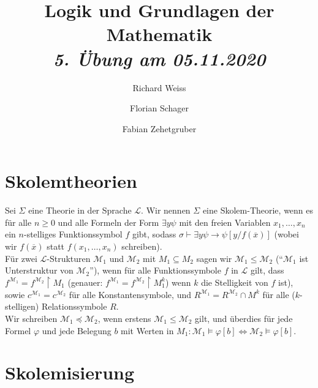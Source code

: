 \documentclass{article}
\title
{
  Logik und Grundlagen der Mathematik \\
  \vspace{4pt}
  \normalsize
  \textit{5. Übung am 05.11.2020}
}
\author
{
  Richard Weiss
  \and
  Florian Schager
  \and
  Fabian Zehetgruber
}
\date{}
\begin{document}
\maketitle
\section*{Skolemtheorien}
Sei $\Sigma$ eine Theorie in der Sprache $\mathscr{L}$. Wir nennen $\Sigma$ eine
Skolem-Theorie, wenn es für alle $n \geq 0$ und alle Formeln der Form $\exists y \psi$
mit den freien Variablen $x_1,\dots,x_n$ ein $n$-stelliges Funktionssymbol $f$ gibt,
sodass $\sigma \vdash \exists y \psi \rightarrow \psi[y/f(\overline{x})]$ (wobei wir
$f(\overline{x})$ statt $f(x_1,\dots,x_n)$ schreiben). \\
Für zwei $\mathscr{L}$-Strukturen $\mathscr{M}_1$ und $\mathscr{M}_2$ mit $M_1 \subseteq M_2$
sagen wir $\mathscr{M}_1 \leq \mathscr{M}_2$ (``$\mathscr{M}_1$ ist Unterstruktur von $\mathscr{M}_2$''),
wenn für alle Funktionssymbole $f$ in $\mathscr{L}$ gilt, dass
$f^{\mathscr{M}_1} = f^{\mathscr{M}_2}\upharpoonright M_1$ (genauer:
$f^{\mathscr{M}_1} = f^{\mathscr{M}_2}\upharpoonright M_1^k$) wenn $k$ die Stelligkeit von $f$ ist),
sowie $c^{\mathscr{M}_1} = c^{\mathscr{M}_2}$ für alle Konstantensymbole, und
$R^{\mathscr{M}_1} = R^{\mathscr{M}_2}\cap M^k$ für alle ($k$-stelligen) Relationssymbole $R$. \\
Wir schreiben $\mathscr{M}_1 \preccurlyeq \mathscr{M}_2$, wenn erstens $\mathscr{M}_1 \leq \mathscr{M}_2$
gilt, und überdies für jede Formel $\varphi$ und jede Belegung $b$ mit Werten in
$M_1: \mathscr{M}_1 \vDash \varphi[b] \iff \mathscr{M}_2 \vDash \varphi[b]$.




\section*{Skolemisierung}


\end{document}
